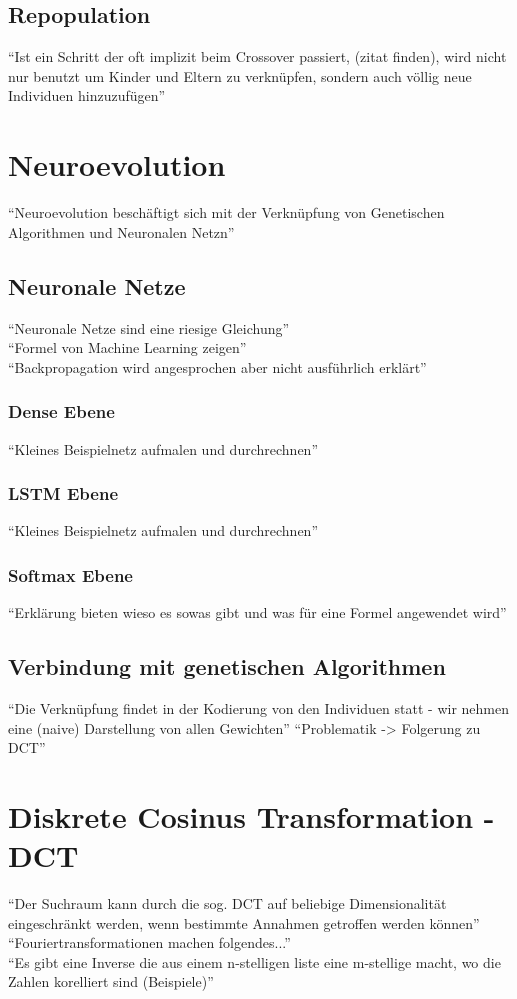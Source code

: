         \subsection{Repopulation}
            ``Ist ein Schritt der oft implizit beim Crossover passiert, (zitat finden), wird nicht nur benutzt um Kinder und Eltern zu verknüpfen, sondern auch völlig neue Individuen hinzuzufügen''

    \section{Neuroevolution}
        ``Neuroevolution beschäftigt sich mit der Verknüpfung von Genetischen Algorithmen und Neuronalen Netzn''
        \subsection{Neuronale Netze}
                ``Neuronale Netze sind eine riesige Gleichung''\\
                ``Formel von Machine Learning zeigen'' \\
                ``Backpropagation wird angesprochen aber nicht ausführlich erklärt''\\
            \subsubsection*{Dense Ebene}
                ``Kleines Beispielnetz aufmalen und durchrechnen''
            \subsubsection*{LSTM Ebene}
                ``Kleines Beispielnetz aufmalen und durchrechnen''
            \subsubsection*{Softmax Ebene}
                ``Erklärung bieten wieso es sowas gibt und was für eine Formel angewendet wird''
        \subsection{Verbindung mit genetischen Algorithmen}
            ``Die Verknüpfung findet in der Kodierung von den Individuen statt - wir nehmen eine (naive) Darstellung von allen Gewichten''
            ``Problematik -> Folgerung zu DCT''

    \section{Diskrete Cosinus Transformation - DCT}
        ``Der Suchraum kann durch die sog. DCT auf beliebige Dimensionalität eingeschränkt werden, wenn bestimmte Annahmen getroffen werden können'' \\
        ``Fouriertransformationen machen folgendes...'' \\
        ``Es gibt eine Inverse die aus einem n-stelligen liste eine m-stellige macht, wo die Zahlen korelliert sind (Beispiele)''
